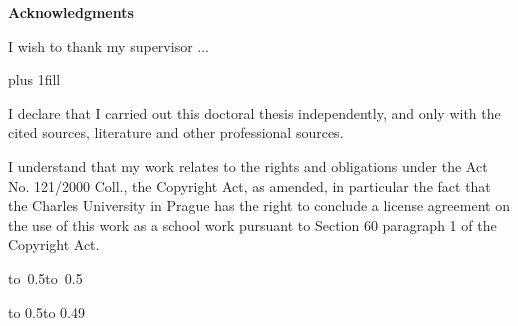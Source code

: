 \documentclass[12pt,a4paper,twoside,openright]{report}
\begin{document}
\newpage


{\Huge\bfseries Acknowledgments 
 \par\nobreak \vskip 20pt
}


I wish to thank my supervisor ...

\newpage


\vglue 0pt plus 1fill

\noindent
I declare that I carried out this doctoral thesis independently, and only with the cited
sources, literature and other professional sources.

\medskip\noindent
I understand that my work relates to the rights and obligations under the Act No.
121/2000 Coll., the Copyright Act, as amended, in particular the fact that the Charles
University in Prague has the right to conclude a license agreement on the use of this
work as a school work pursuant to Section 60 paragraph 1 of the Copyright Act.

\vspace{10mm}

\hbox{\hbox to 0.5\hbox to 0.5}

\vspace{20mm}
\newpage


\vbox to 0.5\nobreak\vbox to 0.49
\end{document}
